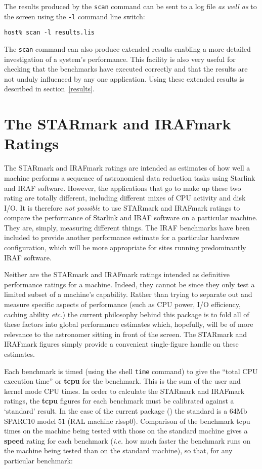 The results produced by the {\tt scan} command can be sent to a log file
{\em as well as} to the screen using the {\tt -l} command line switch:

{\tt host\% scan -l results.lis}

The {\tt scan} command can also produce extended results enabling a
more detailed investigation of a system's performance. This facility is
also very useful for checking that the benchmarks have executed correctly
and that the results are not unduly influenced by any one application.
Using these extended results is described in section~\ref{results}.
  
\newpage
\section{The STARmark and IRAFmark Ratings}
\label{starmark}

The STARmark and IRAFmark ratings are intended as estimates of how well a
machine performs a sequence of astronomical data reduction tasks using
Starlink and IRAF software. However, the applications that go to make up
these two rating are totally different, including different mixes of CPU
activity and disk I/O. It is therefore {\em not possible} to use STARmark
and IRAFmark ratings to compare the performance of Starlink and IRAF
software on a particular machine.  They are, simply, measuring different
things. The IRAF benchmarks have been included to provide another
performance estimate for a particular hardware configuration, which will
be more appropriate for sites running predominantly IRAF software. 

Neither are the STARmark and IRAFmark ratings intended as definitive
performance ratings for a machine. Indeed, they cannot be since they
only test a limited subset of a machine's capability.  Rather than
trying to separate out and measure specific aspects of performance
(such as CPU power, I/O efficiency, caching ability {\em etc.}) the
current philosophy behind this package is to fold all of these factors
into global performance estimates which, hopefully, will be of more
relevance to the astronomer sitting in front of the screen.  The
STARmark and IRAFmark figures simply provide a convenient single-figure
handle on these estimates.

Each benchmark is timed (using the shell {\tt time} command) to give
the ``total CPU execution time'' or {\bf tcpu} for the benchmark. This
is the sum of the user and kernel mode CPU times. In order to calculate
the STARmark and IRAFmark ratings, the {\bf tcpu} figures for each
benchmark must be calibrated against a `standard' result.  In the case
of the current package (\pkgver) the standard is a 64Mb SPARC10 model
51 (RAL machine rlssp0). Comparison of the benchmark tcpu times on the
machine being tested with those on the standard machine gives a {\bf
speed} rating for each benchmark ({\em i.e.} how much faster the
benchmark runs on the machine being tested than on the standard
machine), so that, for any particular benchmark:

